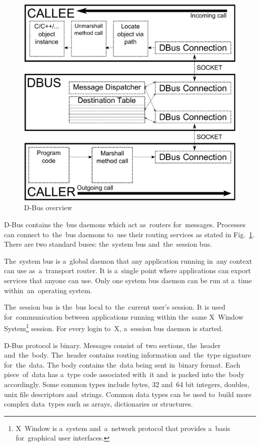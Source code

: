 \documentclass[conference]{IEEEtran}
\begin{document}
\begin{figure}[h]
\centering
\label{fig:dbus_image}
\includegraphics[width=\columnwidth]{dbus_overview.pdf}
\caption{D-Bus overview}
\end{figure}


D-Bus contains the~bus daemons which act as~routers for~messages. Processes
can connect to~the~bus daemons to~use their routing services as stated
in Fig.~\ref{fig:dbus_image}. There are two standard buses:
the~system bus and~the~session bus.


The~system bus is a~global daemon that any application running in~any
context can use as~a~transport router. It is a~single point where applications
can export services that anyone can use. Only one system bus daemon
can be run at a~time within~an~operating system.


The~session bus is the~bus local to~the~current user's session. It is used
for~communication between applications running within the~same X~Window
System\footnote{X~Window is a~system and~a~network protocol that provides
a~basis for~graphical user interfaces.} session. For every login to~X,
a~session bus daemon is started.


D-Bus protocol is binary. Messages consist of~two sections, the~header
and~the~body. The~header contains routing information and~the~type signature
for~the~data. The body contains the~data being sent in~binary format. Each
piece~of~data has a~type code \mbox{associated} with~it and~is packed into the~body
accordingly. Some common types include bytes, 32 and~64 bit integers, doubles,
unix file descriptors and~strings. Common data types can be used to~build more
complex data~types such as arrays, dictionaries or structures.
\end{document}
